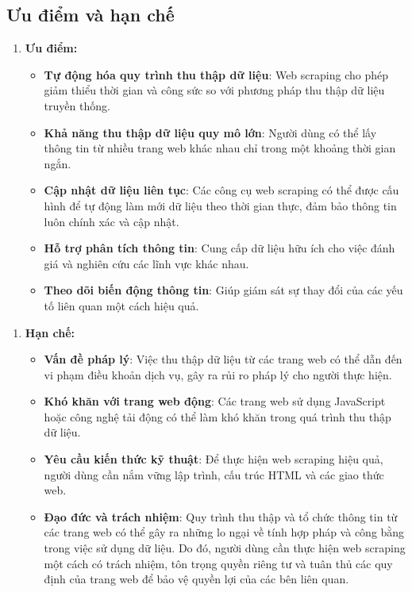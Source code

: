 \subsection{Ưu điểm và hạn chế}
\begin{enumerate}
    \item []
    \textbf{Ưu điểm:}
    \begin{itemize}[left=0.5cm] 
    \item[-] \textbf{Tự động hóa quy trình thu thập dữ liệu}: Web scraping cho phép giảm thiểu thời gian và công sức so với phương pháp thu thập dữ liệu truyền thống.
    
    \item[-] \textbf{Khả năng thu thập dữ liệu quy mô lớn}: Người dùng có thể lấy thông tin từ nhiều trang web khác nhau chỉ trong một khoảng thời gian ngắn.
    
    \item[-] \textbf{Cập nhật dữ liệu liên tục}: Các công cụ web scraping có thể được cấu hình để tự động làm mới dữ liệu theo thời gian thực, đảm bảo thông tin luôn chính xác và cập nhật.
    
    \item[-] \textbf{Hỗ trợ phân tích thông tin}: Cung cấp dữ liệu hữu ích cho việc đánh giá và nghiên cứu các lĩnh vực khác nhau.
    
    \item[-] \textbf{Theo dõi biến động thông tin}: Giúp giám sát sự thay đổi của các yếu tố liên quan một cách hiệu quả.
    \end{itemize}
\end{enumerate}

\begin{enumerate}
    \item []
    \textbf{Hạn chế:}
    \begin{itemize}[left=0.5cm] 
        \item[-] \textbf{Vấn đề pháp lý}: Việc thu thập dữ liệu từ các trang web có thể dẫn đến vi phạm điều khoản dịch vụ, gây ra rủi ro pháp lý cho người thực hiện.
        
        \item[-] \textbf{Khó khăn với trang web động}: Các trang web sử dụng JavaScript hoặc công nghệ tải động có thể làm khó khăn trong quá trình thu thập dữ liệu.
        \newpage
        
        \item[-] \textbf{Yêu cầu kiến thức kỹ thuật}: Để thực hiện web scraping hiệu quả, người dùng cần nắm vững lập trình, cấu trúc HTML và các giao thức web.
        
        \item[-] \textbf{Đạo đức và trách nhiệm}: Quy trình thu thập và tổ chức thông tin từ các trang web có thể gây ra những lo ngại về tính hợp pháp và công bằng trong việc sử dụng dữ liệu. Do đó, người dùng cần thực hiện web scraping một cách có trách nhiệm, tôn trọng quyền riêng tư và tuân thủ các quy định của trang web để bảo vệ quyền lợi của các bên liên quan.\cite{noauthor_web_2021}

        
    \end{itemize}
\end{enumerate}